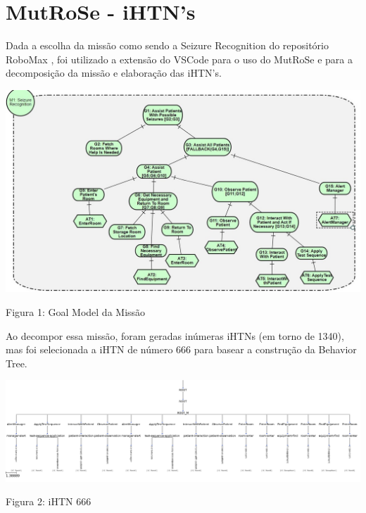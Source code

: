 \documentclass[a4 paper]{article}
\newcommand{\parag}{\hspace{30pt}}
\begin{document}
\section{MutRoSe - iHTN's}
\parag Dada a escolha da missão como sendo a Seizure Recognition do repositório RoboMax \cite{robomax}, foi utilizado a extensão do VSCode para o uso do MutRoSe e para a decomposição da missão e elaboração das iHTN's. 

\begin{table}[h]
\centering
\includegraphics[scale=0.3]{figuras/gm}
\end{table}
\begin{center}
Figura 1: Goal Model da Missão
\end{center}
\vspace{15pt}

Ao decompor essa missão, foram geradas inúmeras iHTNs (em torno de 1340), mas foi selecionada a iHTN de número $666$ para basear a construção da Behavior Tree.
\vspace{15pt}\vspace{15pt}

\begin{table}[h]
\centering
\includegraphics[scale=0.25]{figuras/ihtn_666}
\end{table}
\begin{center}
Figura 2: iHTN 666
\end{center}
\vspace{30pt}
\end{document}
